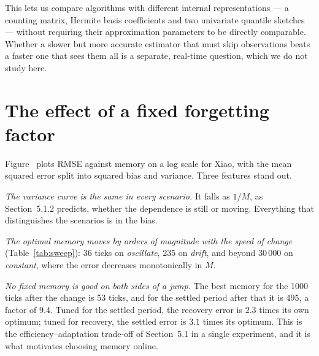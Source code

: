 This lets us compare algorithms with different internal representations --- a counting matrix,
Hermite basis coefficients and two univariate quantile sketches --- without requiring their
approximation parameters to be directly comparable. Whether a slower but more accurate estimator
that must skip observations beats a faster one that sees them all is a separate, real-time
question, which we do not study here.

\section{The effect of a fixed forgetting factor}
\label{sec:fixed}


Figure~ plots RMSE against memory on a log scale for Xiao, with the
mean squared error split into squared bias and variance. Three features stand out.

\emph{The variance curve is the same in every scenario.} It falls as $1/M$, as Section~5.1.2
predicts, whether the dependence is still or moving. Everything that distinguishes the scenarios
is in the bias.

\emph{The optimal memory moves by orders of magnitude with the speed of change}
(Table~\ref{tab:sweep}): 36 ticks on \emph{oscillate}, 235 on \emph{drift}, and beyond 30\,000 on
\emph{constant}, where the error decreases monotonically in $M$.

\emph{No fixed memory is good on both sides of a jump.} The best memory for the 1000 ticks after
the change is 53 ticks, and for the settled period after that it is 495, a factor of 9.4. Tuned for
the settled period, the recovery error is $2.3$ times its own optimum; tuned for recovery, the
settled error is $3.1$ times its optimum. This is the efficiency--adaptation trade-off of
Section~5.1 in a single experiment, and it is what motivates choosing memory online.

